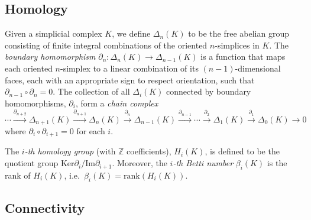 \documentclass[12pt,a4paper]{amsart}
\newtheorem{lemma}[theorem]{Lemma}
\theoremstyle{definition}
\newcommand{\Z}{\ensuremath{\mathbb{Z}}}
\newcommand{\diam}{\ensuremath{\mathrm{diam}}}
\numberwithin{equation}{section}
\begin{document}




\subsection{Homology}

Given a simplicial complex $K$, we define $\Delta_n(K)$ to be the free abelian group consisting of finite integral combinations of the oriented $n$-simplices in $K$.
The \emph{boundary homomorphism} $\partial_n:\Delta_n(K)\rightarrow\Delta_{n-1}(K)$ is a function that maps each oriented $n$-simplex to a linear combination of its $(n-1)$-dimensional faces, each with an appropriate sign to respect orientation, such that $\partial_{n-1}\circ\partial_{n}=0$.
The collection of all $\Delta_i(K)$ connected by boundary homomorphisms, $\partial_i$, form a \emph{chain complex} 
 \[\cdots\xrightarrow{\partial_{n+2}}\Delta_{n+1}(K)\xrightarrow{\partial_{n+1}}\Delta_n(K)\xrightarrow{\partial_n} \Delta_{n-1}(K)\xrightarrow{\partial_{n-1}}\cdots\xrightarrow{\partial_2}\Delta_1(K)\xrightarrow{\partial_1} \Delta_0(K)\rightarrow 0\]
 where $\partial_i\circ\partial_{i+1}=0$ for each $i$.
 
The \emph{$i$-th homology group} (with $\Z$ coefficients), $H_i(K)$, is defined to be the quotient group $\mathrm{Ker}\partial_i/\mathrm{Im}\partial_{i+1}$.
Moreover, the \emph{$i$-th Betti number} $\beta_i(K)$ is the rank of $H_i(K)$, i.e.\ $\beta_i(K)=\mathrm{rank}(H_i(K))$.


\subsection{Connectivity}
\end{document}
